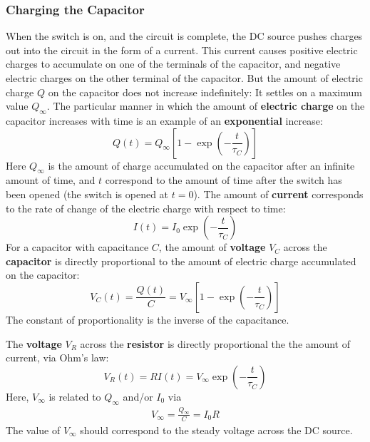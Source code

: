 \subsubsection{Charging the Capacitor}
When the switch is on, and the circuit is complete, the DC source pushes charges out into the circuit in the form of a current. This current causes positive electric charges to accumulate on one of the terminals of the capacitor, and negative electric charges on the other terminal of the capacitor. But the amount of electric charge $Q$ on the capacitor does not increase indefinitely: It settles on a maximum value $Q_{\infty}$. The particular manner in which the amount of \textbf{electric charge} on the capacitor increases with time is an example of an \textbf{exponential} increase:
\begin{equation}
    Q(t) = Q_{\infty} \left[ 1 - \exp\left(-\frac{t}{\tau_{C}}\right) \right]
    \label{eq.05.RC.q.charging}
\end{equation}
Here $Q_{\infty}$ is the amount of charge accumulated on the capacitor after an infinite amount of time, and $t$ correspond to the amount of time after the switch has been opened (the switch is opened at $t = 0$). The amount of \textbf{current} corresponds to the rate of change of the electric charge with respect to time:
\begin{equation}
    I(t) = I_{0} \exp\left(-\frac{t}{\tau_{C}}\right)
    \label{eq.05.RC.i.charging}
\end{equation}
For a capacitor with capacitance $C$, the amount of \textbf{voltage} $V_{C}$ across the \textbf{capacitor} is directly proportional to the amount of electric charge accumulated on the capacitor:
\begin{equation}
    V_{C}(t) = \frac{Q(t)}{C} = V_{\infty} \left[ 1 - \exp\left(-\frac{t}{\tau_{C}}\right) \right]
    \label{eq.05.RC.vC.charging}
\end{equation}
The constant of proportionality is the inverse of the capacitance.

The \textbf{voltage} $V_{R}$ across the \textbf{resistor} is directly proportional the the amount of current, via Ohm's law:
\begin{equation}
    V_{R}(t) = R I(t) = V_{\infty} \exp\left(-\frac{t}{\tau_{C}}\right)
    \label{eq.05.RC.vR.charging}
\end{equation}
Here, $V_{\infty}$ is related to $Q_{\infty}$ and/or $I_{0}$ via
\begin{eqnarray}
    V_{\infty} = \frac{Q_{\infty}}{C} = I_{0} R
\end{eqnarray}
The value of $V_{\infty}$ should correspond to the steady voltage across the DC source.

